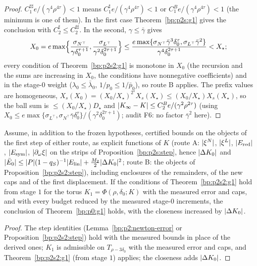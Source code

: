 \begin{proof}
\label{step:p2s2:ff}
$C_1^{\sharp\sharp}e/(\gamma^4\rho^{4\tau})<1$ means $C_1^\sharp e/(\gamma^4\rho^{4\tau})<1$ or $C_1^Be/(\gamma^4\rho^{4\tau})<1$ (the minimum is one of them). In the first case
Theorem~\ref{bp:p2s:g1} gives the conclusion with $C_2^\sharp\le C_2^{\sharp\sharp}$. In the second, $\gamma\le\bar\gamma$ gives
\[
X_0=e\max\Bigl\{\frac{\sigma_{N^\top}}{\gamma\delta_0^{\tau+1}},\frac{\sigma_{L^\top}}{\gamma^2\delta_0^{2\tau+1}}\Bigr\}\le\frac{e\max\{\sigma_{N^\top}\bar\gamma^3\delta_0^\tau,\sigma_{L^\top}\bar\gamma^2\}}{\gamma^4\delta_0^{2\tau+1}}<X_\star;
\]
every condition of Theorem~\ref{bp:p2s2:g1} is monotone in $X_0$ (the recursion and the sums are increasing in $X_0$, the conditions have nonnegative
coefficients) and in the stage-$0$ weight ($\lambda_0\le\bar\lambda_0$, $1/p_0\le1/\bar p_0$), so route B applies. The prefix values are homogeneous,
$X_s(X_0)=(X_0/X_\star)^{2^s}X_s(X_\star)\le(X_0/X_\star)X_s(X_\star)$, so the ball sum is $\le(X_0/X_\star)D_\star$ and
$\lvert K_\infty-K\rvert\le C_2^Be/(\gamma^2\rho^{2\tau})$ (using $X_0\le e\max\{\sigma_{L^\top},\sigma_{N^\top}\bar\gamma\delta_0^\tau\}/(\gamma^2\delta_0^{2\tau+1})$; audit F6: no factor $\bar\gamma^2$ here).
\end{proof}

\begin{corollary}\label{bp:p2s2:hybrid}
Assume, in addition to the frozen hypotheses, certified bounds on the objects of the first step of either route, as explicit functions of $K$ (route A:
$\lvert \xi^N\rvert$, $\lvert \xi^L\rvert$, $\lvert E_{\mathrm{red}}\rvert$, $\lvert E_{\mathrm{sym}}\rvert$, $\lvert \partial_\omega\xi\rvert$ on the strips of Proposition~\ref{bp:p2s:step}, hence $\lvert \Delta K_0\rvert$ and
$\lvert \bar E_0\rvert\le\lvert P\rvert(1-q_S)^{-1}\lvert E_{\mathrm{lin}}\rvert+\frac{M_2}2\lvert \Delta K_0\rvert^2$; route B: the objects of Proposition~\ref{bp:p2s2:step}), including enclosures of the
remainders, of the new caps and of the first displacement. If the conditions of Theorem~\ref{bp:p2s2:g1} hold from stage $1$ for the torus
$K_1=\Phi(\rho,\delta_0;K)$ with the measured error and caps, and with every budget reduced by the measured stage-$0$ increments, the conclusion
of Theorem~\ref{bp:p0:g1} holds, with the closeness increased by $\lvert \Delta K_0\rvert$.
\end{corollary}

\begin{proof}
\label{step:p2s2:hy}
The step identities (Lemma~\ref{bp:p2:newton-error} or Proposition~\ref{bp:p2s2:step}) hold with the measured bounds in place of the derived ones; $K_1$ is admissible on
$T_{\rho-3\delta_0}$ with the measured error and caps, and Theorem~\ref{bp:p2s2:g1} (from stage $1$) applies; the closeness adds $\lvert \Delta K_0\rvert$.
\end{proof}


